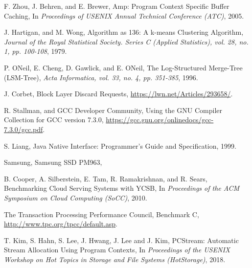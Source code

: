 \begin{thebibliography}{00}
F. Zhou, J. Behren, and E. Brewer,
Amp: Program Context Specific Buffer Caching,
In \textit{Proceedings of USENIX Annual Technical Conference (ATC)}, 2005.

J. Hartigan, and M. Wong,
Algorithm as 136: A k-means Clustering Algorithm,
\textit{Journal of the Royal Statistical Society. Series C (Applied Statistics),
vol. 28, no. 1, pp. 100-108}, 1979.

P. ONeil, E. Cheng, D. Gawlick, and E. ONeil,
The Log-Structured Merge-Tree (LSM-Tree),
\textit{Acta Informatica, vol. 33, no. 4, pp. 351-385}, 1996.

J. Corbet,
Block Layer Discard Requests,
\url{https://lwn.net/Articles/293658/}.

R. Stallman, and GCC Developer Community,
Using the GNU Compiler Collection for GCC version 7.3.0,
\url{https://gcc.gnu.org/onlinedocs/gcc-7.3.0/gcc.pdf}.

S. Liang,
Java Native Interface: Programmer's Guide and Specification,
1999.

Samsung, Samsung SSD PM963, 


B. Cooper, A. Silberstein, E. Tam, R. Ramakrishnan, and R. Sears,
Benchmarking Cloud Serving Systems with YCSB,
In \textit{Proceedings of the ACM Symposium on Cloud Computing (SoCC)}, 2010.

The Transaction Processing Performance Council,
Benchmark C,
\url{http://www.tpc.org/tpcc/default.asp}. 

T. Kim, S. Hahn, S. Lee, J. Hwang, J. Lee and J. Kim,
PCStream: Automatic Stream Allocation Using Program Contexts,
In \textit{Proceedings of the USENIX Workshop on Hot Topics in Storage
and File Systems (HotStorage)}, 2018.


\end{thebibliography}
